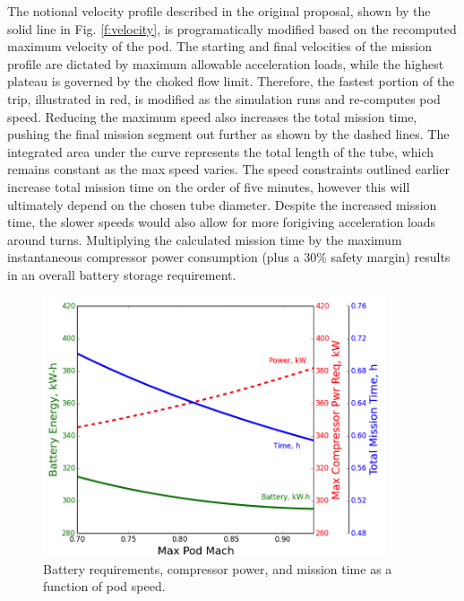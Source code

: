 \documentclass[heading.tex]{subfiles}
\begin{document}
The notional velocity profile described in the original proposal, shown by the solid line in Fig. \ref{f:velocity},
is programatically modified based on the recomputed maximum velocity of the pod. The starting and final velocities of the
mission profile are dictated by maximum allowable acceleration loads, while the highest plateau is governed by the
choked flow limit. Therefore, the fastest portion of the trip, illustrated in red, is modified as the simulation runs and re-computes pod speed.
Reducing the maximum speed also increases the total mission time,
pushing the final mission segment out further as shown by the dashed lines.
The integrated area under the curve represents the total length of the tube, which remains constant as the max speed varies.
The speed constraints outlined earlier increase total mission time on the order of five minutes,
however this will ultimately depend on the chosen tube diameter.
Despite the increased mission time, the slower speeds would also allow for more forigiving acceleration loads around turns.
Multiplying the calculated mission time by the maximum instantaneous compressor power consumption (plus a 30\% safety margin)
results in an overall battery storage requirement.

\begin{figure}[hbtp]
\centering
\includegraphics[width=0.9\textwidth]{images/battery_plot2.png}
\caption[Battery/Compressor/Mission requirements as a function of pod speed]
{Battery requirements, compressor power, and mission time as a function of pod speed.}
\label{f:battery}
\end{figure}
\end{document}
